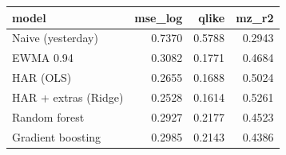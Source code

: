 \begin{tabular}{lrrr}
\toprule
model & mse_log & qlike & mz_r2 \\
\midrule
Naive (yesterday) & 0.7370 & 0.5788 & 0.2943 \\
EWMA 0.94 & 0.3082 & 0.1771 & 0.4684 \\
HAR (OLS) & 0.2655 & 0.1688 & 0.5024 \\
HAR + extras (Ridge) & 0.2528 & 0.1614 & 0.5261 \\
Random forest & 0.2927 & 0.2177 & 0.4523 \\
Gradient boosting & 0.2985 & 0.2143 & 0.4386 \\
\bottomrule
\end{tabular}
